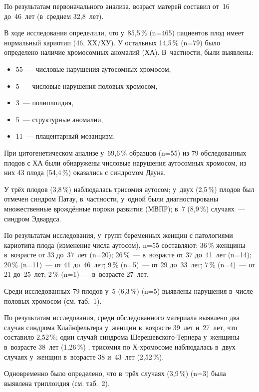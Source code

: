 По результатам первоначального анализа, возраст матерей составил от~16 до~46~лет (в~среднем 32,8~лет).

В ходе исследования определили, что у~85,5\,\% (n=465) пациентов плод имеет нормальный кариотип (46, ХХ/ХУ). У остальных 14,5\,\% (n=79) было определено наличие хромосомных аномалий (ХА). В~частности, были выявлены:
\begin{itemize}[noitemsep]\vspace{-6pt}
  \item 55~--- числовые нарушения аутосомных хромосом,
\item  5~--- числовые нарушения половых хромосом,
\item  3~--- полиплоидия,
\item  5~--- структурные аномалии,
\item  11~--- плацентарный мозаицизм.
\end{itemize}
\vspace{-6pt}
При цитогенетическом анализе у~69,6\,\% образцов (n=55) из 79 обследованных плодов с ХА были обнаружены числовые нарушения аутосомных хромосом, из них 43 плода (54,4\,\%) оказались с синдромом Дауна.

У трёх плодов (3,8\,\%) наблюдалась трисомия аутосом; у~двух (2,5\,\%) плодов был отмечен синдром Патау, в~частности, у~одной были диагностированы множественные врождённые пороки развития (МВПР); в~7 (8,9\,\%) случаях~--- синдром Эдвардса.

По результатам исследования, у~групп беременных женщин с патологиями кариотипа плода (изменение числа аутосом), n=55 составляют: 36\,\% женщины в~возрасте от 33 до~37~лет (n=20); 26\,\%~--- в~возрасте от 37 до~41~лет (n=14); 20\,\% (n=11)~--- от 41 до~46~лет; 9\,\% (n=5)~--- от 29 до~33~лет; 7\,\% (n=4)~--- от 21 до~25~лет; 2\,\% (n=1)~--- в~возрасте 27~лет.

Среди исследованных 79 плодов у~5 (6,3\,\%) (n=5) выявлены нарушения в~числе половых хромосом (см. таб.~1).



По результатам исследования, среди обследованного материала выявлено два случая синдрома Клайнфельтера у~женщин в~возрасте 39~лет и~27~лет, что составило 2,52\,\%; \enlargethispage{2\baselineskip}один случай синдрома Шерешевского-Тернера у~женщины в~возрасте 38~лет (1,26\,\%) ; трисомия по Х-хромосоме наблюдалась в~двух случаях у~женщин в~возрасте 38 и~43~лет (2,52\,\%).

Одновременно было определено, что в~трёх случаях (3,9\,\%) (n=3) была выявлена триплоидия (см. таб.~2).

